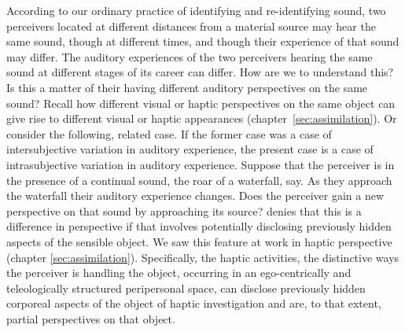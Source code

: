 According to our ordinary practice of identifying and re-identifying sound, two perceivers located at different distances from a material source may hear the same sound, though at different times, and though their experience of that sound may differ. The auditory experiences of the two perceivers hearing the same sound at different stages of its career can differ. How are we to understand this? Is this a matter of their having different auditory perspectives on the same sound? Recall how different visual or haptic perspectives on the same object can give rise to different visual or haptic appearances (chapter~\ref{sec:assimilation}). Or consider the following, related case. If the former case was a case of intersubjective variation in auditory experience, the present case is a case of intrasubjective variation in auditory experience. Suppose that the perceiver is in the presence of a continual sound, the roar of a waterfall, say. As they approach the waterfall their auditory experience changes. Does the perceiver gain a new perspective on that sound by approaching its source? \citet[135]{Smith:2002sa} denies that this is a difference in perspective if that involves potentially disclosing previously hidden aspects of the sensible object. We saw this feature at work in haptic perspective (chapter \ref{sec:assimilation}). Specifically, the haptic activities, the distinctive ways the perceiver is handling the object, occurring in an ego-centrically and teleologically structured peripersonal space, can disclose previously hidden corporeal aspects of the object of haptic investigation and are, to that extent, partial perspectives on that object. 


